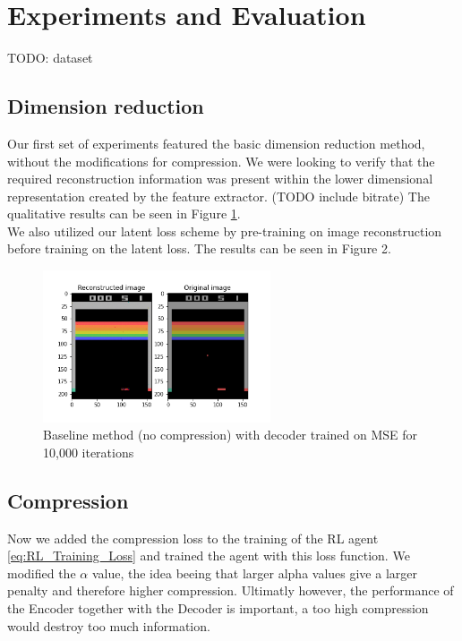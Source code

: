 \section{Experiments and Evaluation}
TODO: dataset
\subsection{Dimension reduction}
Our first set of experiments featured the basic dimension reduction method,
without the modifications for compression. We were looking to verify that the
required reconstruction information was present within the lower dimensional
representation created by the feature extractor. (TODO include bitrate) The
qualitative results can be seen in Figure \ref{fig:baseline_MSE}. \\

We also utilized our latent loss scheme by pre-training on image reconstruction
before training on the latent loss. The results can be seen in Figure 2.
\begin{figure}[H]
    \centering
    \includegraphics[width=0.6\textwidth]{images/orig_reconstructed0.0.png}
    \caption{Baseline method (no compression) with decoder trained on MSE for 10,000 iterations}
    \label{fig:baseline_MSE}
\end{figure}


\subsection{Compression}
Now we added the compression loss to the training of the RL agent
\ref{eq:RL_Training_Loss} and trained the agent with this loss function. We
modified the $\alpha$ value, the idea beeing that larger alpha values give a
larger penalty and therefore higher compression. Ultimatly however, the
performance of the Encoder together with the Decoder is important, a too high
compression would destroy too much information. %

